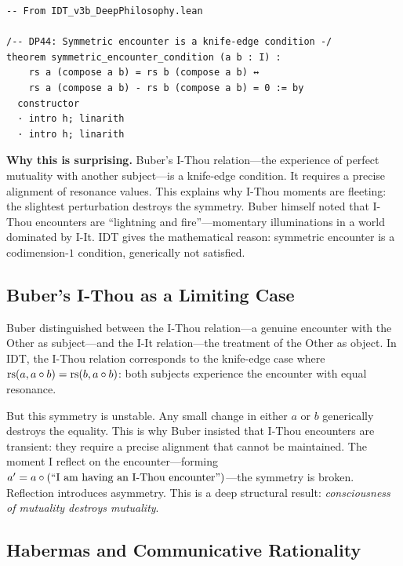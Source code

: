\begin{lstlisting}
-- From IDT_v3b_DeepPhilosophy.lean

/-- DP44: Symmetric encounter is a knife-edge condition -/
theorem symmetric_encounter_condition (a b : I) :
    rs a (compose a b) = rs b (compose a b) ↔
    rs a (compose a b) - rs b (compose a b) = 0 := by
  constructor
  · intro h; linarith
  · intro h; linarith
\end{lstlisting}

\begin{surprisebox}
\noindent\textbf{Why this is surprising.}
Buber's I-Thou relation---the experience of perfect mutuality with another
subject---is a knife-edge condition.  It requires a precise alignment of
resonance values.  This explains why I-Thou moments are fleeting: the
slightest perturbation destroys the symmetry.  Buber himself noted that
I-Thou encounters are ``lightning and fire''---momentary illuminations in a
world dominated by I-It.  IDT gives the mathematical reason: symmetric
encounter is a codimension-$1$ condition, generically not satisfied.
\end{surprisebox}

\subsection{Buber's I-Thou as a Limiting Case}

Buber distinguished between the I-Thou relation---a genuine encounter with
the Other as subject---and the I-It relation---the treatment of the Other
as object.  In IDT, the I-Thou relation corresponds to the knife-edge case
where $\mathrm{rs}(a, a \circ b) = \mathrm{rs}(b, a \circ b)$: both subjects experience
the encounter with equal resonance.

But this symmetry is unstable.  Any small change in either $a$ or $b$
generically destroys the equality.  This is why Buber insisted that I-Thou
encounters are transient: they require a precise alignment that cannot be
maintained.  The moment I reflect on the encounter---forming
$a' = a \circ (\text{``I am having an I-Thou encounter''})$---the symmetry
is broken.  Reflection introduces asymmetry.  This is a deep structural
result: \emph{consciousness of mutuality destroys mutuality}.

\subsection{Habermas and Communicative Rationality}

